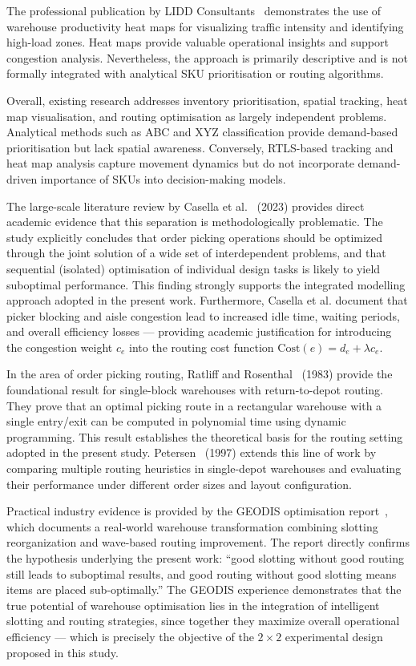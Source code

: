 \documentclass[12pt,a4paper]{article}
\begin{document}
The professional publication by LIDD Consultants~\cite{ref5} demonstrates the use of
warehouse productivity heat maps for visualizing traffic intensity and identifying high-load
zones. Heat maps provide valuable operational insights and support congestion analysis.
Nevertheless, the approach is primarily descriptive and is not formally integrated with
analytical SKU prioritisation or routing algorithms.

Overall, existing research addresses inventory prioritisation, spatial tracking, heat map
visualisation, and routing optimisation as largely independent problems. Analytical methods
such as ABC and XYZ classification provide demand-based prioritisation but lack spatial
awareness. Conversely, RTLS-based tracking and heat map analysis capture movement
dynamics but do not incorporate demand-driven importance of SKUs into decision-making
models.

The large-scale literature review by Casella et al.~\cite{ref7} (2023) provides direct academic
evidence that this separation is methodologically problematic. The study explicitly concludes
that order picking operations should be optimized through the joint solution of a wide
set of interdependent problems, and that sequential (isolated) optimisation of individual
design tasks is likely to yield suboptimal performance. This finding strongly supports
the integrated modelling approach adopted in the present work. Furthermore, Casella et al.
document that picker blocking and aisle congestion lead to increased idle time, waiting
periods, and overall efficiency losses --- providing academic justification for introducing the
congestion weight $c_e$ into the routing cost function $\mathrm{Cost}(e) = d_e + \lambda c_e$.

In the area of order picking routing, Ratliff and Rosenthal~\cite{ref_ratliff} (1983)
provide the foundational result for single-block warehouses with return-to-depot routing.
They prove that an optimal picking route in a rectangular warehouse with a single entry/exit
can be computed in polynomial time using dynamic programming. This result establishes the
theoretical basis for the routing setting adopted in the present study. Petersen~\cite{ref_petersen}
(1997) extends this line of work by comparing multiple routing heuristics in single-depot
warehouses and evaluating their performance under different order sizes and layout
configuration.

Practical industry evidence is provided by the GEODIS optimisation report~\cite{ref8}, which
documents a real-world warehouse transformation combining slotting reorganization and
wave-based routing improvement. The report directly confirms the hypothesis underlying the
present work: ``good slotting without good routing still leads to suboptimal results,
and good routing without good slotting means items are placed sub-optimally.''  The GEODIS
experience demonstrates that the true potential of warehouse optimisation lies in the
integration of intelligent slotting and routing strategies, since together they maximize
overall operational efficiency --- which is precisely the objective of the $2 \times 2$
experimental design proposed in this study.
\end{document}
